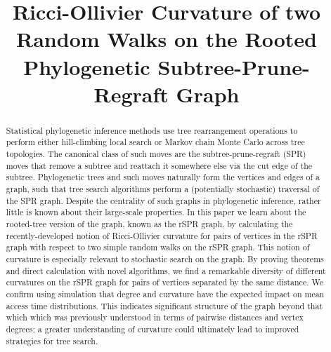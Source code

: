 \documentclass[11pt,onecolumn,conference]{IEEEtran}
\begin{document}
\title{Ricci-Ollivier Curvature of two Random Walks on the Rooted Phylogenetic Subtree-Prune-Regraft Graph}

\author{
	\and
}

\maketitle
\IEEEpeerreviewmaketitle

\begin{abstract}
Statistical phylogenetic inference methods use tree rearrangement operations to perform either hill-climbing local search or Markov chain Monte Carlo across tree topologies.
The canonical class of such moves are the subtree-prune-regraft (SPR) moves that remove a subtree and reattach it somewhere else via the cut edge of the subtree.
Phylogenetic trees and such moves naturally form the vertices and edges of a graph, such that tree search algorithms perform a (potentially stochastic) traversal of the SPR graph.
Despite the centrality of such graphs in phylogenetic inference, rather little is known about their large-scale properties.
In this paper we learn about the rooted-tree version of the graph, known as the rSPR graph, by calculating the recently-developed notion of Ricci-Ollivier curvature for pairs of vertices in the rSPR graph with respect to two simple random walks on the rSPR graph.
This notion of curvature is especially relevant to stochastic search on the graph.
By proving theorems and direct calculation with novel algorithms, we find a remarkable diversity of different curvatures on the rSPR graph for pairs of vertices separated by the same distance.
We confirm using simulation that degree and curvature have the expected impact on mean access time distributions.
This indicates significant structure of the graph beyond that which which was previously understood in terms of pairwise distances and vertex degrees; a greater understanding of curvature could ultimately lead to improved strategies for tree search.
\end{abstract}
\end{document}
